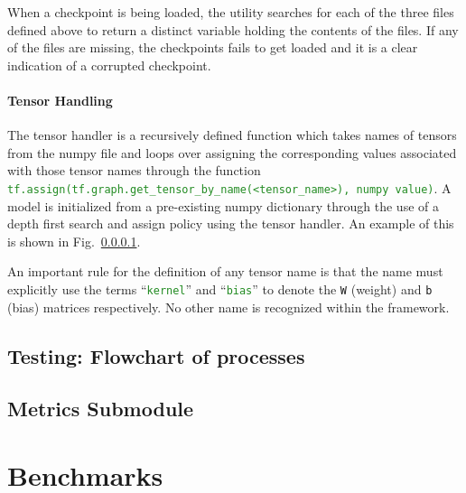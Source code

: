 \documentclass{llncs}
\begin{document}
When a checkpoint is being loaded, the utility searches for each of the three files defined above to return a distinct variable holding the contents of the files.
If any of the files are missing, the checkpoints fails to get loaded and it is a clear indication of a corrupted checkpoint.

\paragraph{Tensor Handling}
The tensor handler is a recursively defined function which takes names of tensors from the numpy file and loops over assigning the corresponding values associated with those tensor names through the function \texttt{\textcolor{ForestGreen}{tf.assign(tf.graph.get\_tensor\_by\_name(\textless tensor\_name\textgreater), numpy value)}}.
A model is initialized from a pre-existing numpy dictionary through the use of a depth first search and assign policy using the tensor handler. 
An example of this is shown in Fig.~\ref{}.

An important rule for the definition of any tensor name is that the name must explicitly use the terms ``\texttt{\textcolor{ForestGreen}{kernel}}'' and ``\texttt{\textcolor{ForestGreen}{bias}}'' to denote the \texttt{W} (weight) and \texttt{b} (bias) matrices respectively.
No other name is recognized within the framework.

\subsection{Testing: Flowchart of processes}
\label{sec:testing}

\subsection{Metrics Submodule}
\label{sec:metrics}

\section{Benchmarks}
\label{sec:benchmarks}

\clearpage



\end{document}
